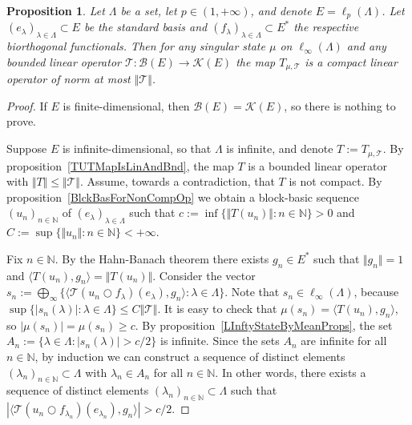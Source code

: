 \documentclass[12pt]{article}
\newtheorem{proposition}[theorem]{Proposition}
\begin{document}
\begin{proposition}\label{TUTMapIsComp}
    Let $\Lambda$ be a set, let $p\in(1,+\infty)$, and 
    denote $E=\ell_p(\Lambda)$. Let $(e_\lambda)_{\lambda\in\Lambda}\subset E$ 
    be the standard basis and $(f_\lambda)_{\lambda\in\Lambda}\subset E^*$ the 
    respective biorthogonal functionals. Then for any singular state $\mu$ 
    on $\ell_\infty(\Lambda)$ and any bounded linear 
    operator $\mathcal{T}:\mathcal{B}(E)\to\mathcal{K}(E)$ the 
    map $T_{\mu, \mathcal{T}}$ is a compact linear operator of norm at 
    most $\Vert \mathcal{T}\Vert$. 
\end{proposition}
\begin{proof} If $E$ is finite-dimensional, then 
    $\mathcal{B}(E)=\mathcal{K}(E)$, so there is nothing to prove.

    Suppose $E$ is infinite-dimensional, so that $\Lambda$ is infinite, and 
    denote $T:=T_{\mu, \mathcal{T}}$. By 
    proposition~\ref{TUTMapIsLinAndBnd}, the map $T$ is a bounded 
    linear operator with $\Vert T\Vert\leq\Vert \mathcal{T}\Vert$.
    Assume, towards a contradiction, that $T$ is not compact. 
    By proposition~\ref{BlckBasForNonCompOp} we obtain a block-basic 
    sequence $(u_n)_{n\in\mathbb{N}}$ of $(e_\lambda)_{\lambda\in\Lambda}$ such
    that $c:=\inf\{\Vert T(u_n)\Vert:n\in\mathbb{N}\}>0$ 
    and $C:=\sup\{\Vert u_n\Vert:n\in\mathbb{N}\}<+\infty$.

    Fix $n\in\mathbb{N}$. By the Hahn-Banach theorem there exists $g_n\in E^*$ 
    such that $\Vert g_n\Vert=1$ and 
    $
        \langle T(u_n), g_n\rangle=\Vert T(u_n)\Vert
    $.
    Consider the vector 
    $
        s_n:=\bigoplus\nolimits_\infty\{
            \langle \mathcal{T}(u_n\bigcirc f_\lambda)(e_\lambda), g_n\rangle: 
            \lambda\in\Lambda
        \}.
    $
    Note that $s_n\in\ell_\infty(\Lambda)$, 
    because 
    $
        \sup\{|s_n(\lambda)| : \lambda\in\Lambda\} \leq C\Vert \mathcal{T}\Vert.
    $ 
    It is easy to check that
    $
        \mu(s_n)=\langle T(u_n), g_n\rangle
    $,
    so $|\mu(s_n)|=\mu(s_n)\geq c$. By 
    proposition~\ref{LInftyStateByMeanProps}, the 
    set $A_n:=\{\lambda\in\Lambda: |s_n(\lambda)|> c/2\}$ is infinite.
    Since the sets $A_n$ are infinite for all $n\in\mathbb{N}$, by induction we 
    can construct a sequence of distinct 
    elements $(\lambda_n)_{n\in\mathbb{N}}\subset\Lambda$ 
    with $\lambda_n\in A_n$ for all $n\in\mathbb{N}$. In other words, there 
    exists a sequence of distinct 
    elements $(\lambda_n)_{n\in\mathbb{N}}\subset\Lambda$ such that
    $
        |\langle 
            \mathcal{T}(u_n\bigcirc f_{\lambda_n})(e_{\lambda_n}), g_n
        \rangle| > c/2.
    $


\end{proof}
\end{document}
